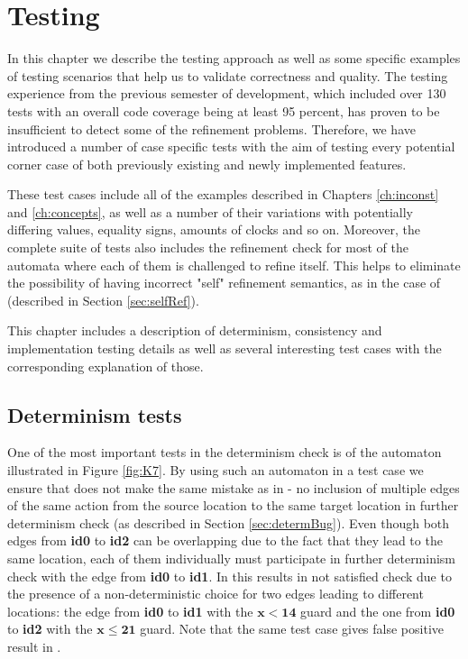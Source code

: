 \chapter{Testing}\label{ch:testing}
In this chapter we describe the testing approach as well as some specific examples of testing scenarios that help us to validate correctness and quality. The testing experience from the previous semester of \jecdar development, which included over 130 tests with an overall code coverage being at least 95 percent, has proven to be insufficient to detect some of the refinement problems. Therefore, we have introduced a number of case specific tests with the aim of testing every potential corner case of both previously existing and newly implemented features.

These test cases include all of the examples described in Chapters \ref{ch:inconst} and \ref{ch:concepts}, as well as a number of their variations with potentially differing values, equality signs, amounts of clocks and so on. Moreover, the complete suite of tests also includes the refinement check for most of the automata where each of them is challenged to refine itself. This helps to eliminate the possibility of \jecdar having incorrect "self" refinement semantics, as in the case of  (described in Section \ref{sec:selfRef}).

This chapter includes a description of determinism, consistency and implementation testing details as well as several interesting test cases with the corresponding explanation of those.

\section{Determinism tests} \label{determinismTests}
One of the most important tests in the determinism check is of the automaton illustrated in Figure \ref{fig:K7}. By using such an automaton in a test case we ensure that \jecdar does not make the same mistake as in  - no inclusion of multiple edges of the same action from the source location to the same target location in further determinism check (as described in Section \ref{sec:determBug}). Even though both edges from \textbf{id0} to \textbf{id2} can be overlapping due to the fact that they lead to the same location, each of them individually must participate in further determinism check with the edge from \textbf{id0} to \textbf{id1}. In \jecdar this results in not satisfied check due to the presence of a non-deterministic choice for two edges leading to different locations: the edge from \textbf{id0} to \textbf{id1} with the $\bm{x<14}$ guard and the one from \textbf{id0} to \textbf{id2} with the $\bm{x \leq 21}$ guard. Note that the same test case gives false positive result in .

